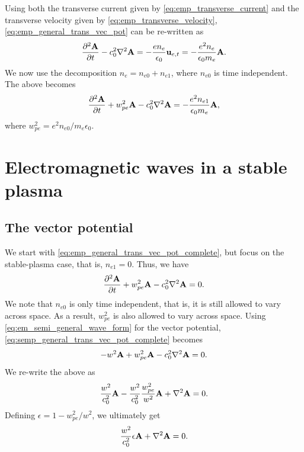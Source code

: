 \documentclass[a4paper,11pt]{report}
\begin{document}
Using both the transverse current given by \cref{eq:emp_transverse_current} and the transverse velocity given by \cref{eq:emp_transverse_velocity}, \cref{eq:emp_general_trans_vec_pot} can be re-written as
\begin{equation*}
    \frac{\partial^2 \mathbf{A}}{\partial t} - c_0^2 \nabla^2 \mathbf{A} = -\frac{e n_e}{\epsilon_0} \mathbf{u}_{e,t} = -\frac{e^2 n_e}{\epsilon_0 m_e} \mathbf{A}.
\end{equation*}
We now use the decomposition $n_e = n_{e0} + n_{e1}$, where $n_{e0}$ is time independent. The above becomes
\begin{equation}
    \label{eq:emp_general_trans_vec_pot_complete}
    \frac{\partial^2 \mathbf{A}}{\partial t} + w_{pe}^2 \mathbf{A} - c_0^2 \nabla^2 \mathbf{A} = -\frac{e^2 n_{e1}}{\epsilon_0 m_e} \mathbf{A},
\end{equation}
where $w_{pe}^2 = e^2 n_{e0} / m_e \epsilon_0$.

\chapter{Electromagnetic waves in a stable plasma}
\section{The vector potential}
\label{sec:semp_vector_potential}
We start with \cref{eq:emp_general_trans_vec_pot_complete}, but focus on the stable-plasma case, that is, $n_{e1} = 0$. Thus, we have
\begin{equation}
    \label{eq:semp_general_trans_vec_pot_complete}
    \frac{\partial^2 \mathbf{A}}{\partial t} + w_{pe}^2 \mathbf{A} - c_0^2 \nabla^2 \mathbf{A} = 0.
\end{equation}
We note that $n_{e0}$ is only time independent, that is, it is still allowed to vary across space. As a result, $w_{pe}^2$ is also allowed to vary across space. Using \cref{eq:em_semi_general_wave_form} for the vector potential, \cref{eq:semp_general_trans_vec_pot_complete} becomes
\begin{equation*}
    -w^2 \mathbf{A} + w_{pe}^2 \mathbf{A} - c_0^2 \nabla^2 \mathbf{A} = 0.
\end{equation*}
We re-write the above as
\begin{equation*}
    \frac{w^2}{c_0^2} \mathbf{A} - \frac{w^2}{c_0^2} \frac{w_{pe}^2}{w^2} \mathbf{A} + \nabla^2 \mathbf{A} = 0.
\end{equation*}
Defining $\epsilon = 1 - w_{pe}^2 / w^2$, we ultimately get
\begin{equation}
    \label{eq:semp_general_trans_vec_pot_complete_spec}
    \frac{w^2}{c_0^2} \epsilon \mathbf{A} + \nabla^2 \mathbf{A} = 0.
\end{equation}
\end{document}

